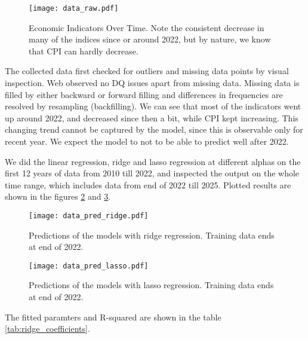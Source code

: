 \documentclass{article}
\begin{document}
\begin{figure}[ht]
      \centering
      \texttt{[image: data\_raw.pdf]}
      \caption{Economic Indicators Over Time.
            Note the consistent decrease in many of the indices since or around 2022,
            but by nature, we know that CPI can hardly decrease.}
      \label{fig:economic_indicators}
\end{figure}

The collected data first checked for outliers and missing data points by visual inspection.
Web observed no DQ issues apart from missing data.
Missing data is filled by either backward or forward filling
and differences in frequencies are resolved by resampling (backfilling).
We can see that most of the indicators went up around 2022,
and decreased since then a bit, while CPI kept increasing.
This changing trend cannot be captured by the model,
since this is observable only for recent year.
We expect the model to not to be able to predict well after 2022.

We did the linear regression, ridge and lasso regression at different alphas
on the first 12 years of data from 2010 till 2022, and inspected the output on the whole time range,
which includes data from end of 2022 till 2025. Plotted results are shown in the figures \ref{fig:ridge_predictions} and \ref{fig:lasso_predictions}.

\begin{figure}[ht]
      \centering
      \texttt{[image: data\_pred\_ridge.pdf]}
      \caption{Predictions of the models with ridge regression.
            Training data ends at end of 2022.}
      \label{fig:ridge_predictions}
\end{figure}


\begin{figure}[ht]
      \centering
      \texttt{[image: data\_pred\_lasso.pdf]}
      \caption{Predictions of the models with lasso regression.
            Training data ends at end of 2022.}
      \label{fig:lasso_predictions}
\end{figure}

The fitted paramters and R-squared are shown in the table \ref{tab:ridge_coefficients}.
\end{document}
